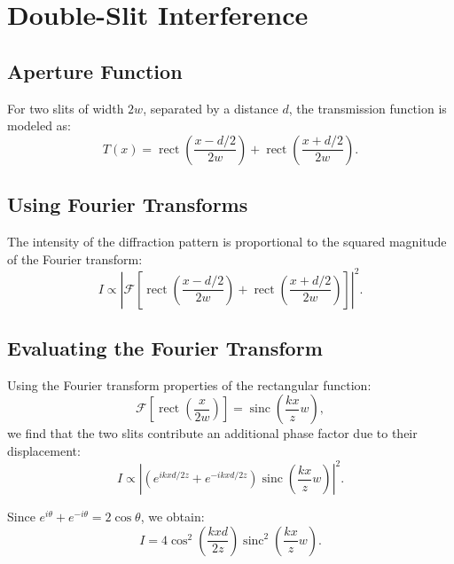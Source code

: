 \documentclass[11pt]{article}
\begin{document}
\section{Double-Slit Interference}

\subsection{Aperture Function}
For two slits of width \( 2w \), separated by a distance \( d \), the transmission function is modeled as:
\begin{equation}
    T(x) = \operatorname{rect} \left(\frac{x - d/2}{2w} \right) + \operatorname{rect} \left(\frac{x + d/2}{2w} \right).
\end{equation}

\subsection{Using Fourier Transforms}
The intensity of the diffraction pattern is proportional to the squared magnitude of the Fourier transform:
\begin{equation}
    I \propto \left| \mathcal{F} \left[ \operatorname{rect} \left(\frac{x - d/2}{2w} \right) + \operatorname{rect} \left(\frac{x + d/2}{2w} \right) \right] \right|^2.
\end{equation}

\subsection{Evaluating the Fourier Transform}
Using the Fourier transform properties of the rectangular function:
\begin{equation}
    \mathcal{F} \left[ \operatorname{rect} \left( \frac{x}{2w} \right) \right] = \operatorname{sinc} \left(\frac{kx}{z} w\right),
\end{equation}
we find that the two slits contribute an additional phase factor due to their displacement:
\begin{equation}
    I \propto \left| \left( e^{i k x d / 2z} + e^{-i k x d / 2z} \right) \operatorname{sinc} \left( \frac{kx}{z} w \right) \right|^2.
\end{equation}

Since \( e^{i\theta} + e^{-i\theta} = 2\cos\theta \), we obtain:
\begin{equation}
    I = 4 \cos^2 \left( \frac{kx d}{2z} \right) \operatorname{sinc}^2 \left( \frac{kx}{z} w \right).
\end{equation}
\end{document}
